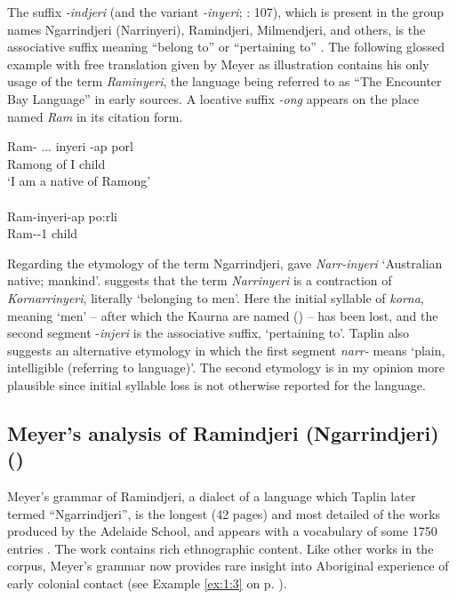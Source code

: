 The suffix \textit{{}-indjeri} (and the variant \textit{{}-inyeri}; \citealt{tindale_notes_1937}: 107), which is present in the group names Ngarrindjeri (Narrinyeri), Ramindjeri, Milmendjeri, and others, is the associative suffix meaning “belong to” or “pertaining to” \citep[63]{meyer_vocabulary_1843}. The following glossed example with free translation given by Meyer as illustration contains his only usage of the term \textit{Raminyeri}, the language being referred to as ``The Encounter Bay Language'' in early sources. A locative suffix \textit{-ong} appears on the place named \textit{Ram} in its citation form.

\ea\label{ex:key:36}
	\gll Ram- ... inyeri -ap     porl \\
	Ramong  {}   of       I       child \\
	\glt  `I am a native of Ramong' \\
	\citep[63]{meyer_vocabulary_1843} \\
	\gll Ram-inyeri-ap        po:rli\\
	Ram--1       child \\
\z

Regarding the etymology of the term Ngarrindjeri, \citet[84]{meyer_vocabulary_1843} gave \textit{Narr-inyeri} `Australian native; mankind'. \citet[34]{taplin_1879a_nodate} suggests that the term \textit{Narrinyeri} is a contraction of \textit{Kornarrinyeri}, literally `belonging to men'. Here the initial syllable of \textit{korna}, meaning `men' – after which the Kaurna are named () – has been lost, and the second segment -\textit{injeri} is the associative suffix, `pertaining to'. Taplin also suggests an alternative etymology in which the first segment \textit{narr-} means `plain, intelligible (referring to language)'. The second etymology is in my opinion more plausible since initial syllable loss is not otherwise reported for the language.

\subsection{Meyer’s analysis of Ramindjeri (Ngarrindjeri) (\citeyear{meyer_vocabulary_1843})}
\label{sec:key:6.1.2}\label{bkm:Ref456096204}

Meyer’s grammar of Ramindjeri, a dialect of a language which Taplin later termed ``Ngarrindjeri'', is the longest (42 pages) and most detailed of the works produced by the Adelaide School, and appears with a vocabulary of some 1750 entries \citep[64]{Gale2011}. The work contains rich ethnographic content. Like other works in the corpus, Meyer’s grammar now provides rare insight into Aboriginal experience of early colonial contact (see Example \ref{ex:1:3} on p. \pageref{ex:1:3}).


